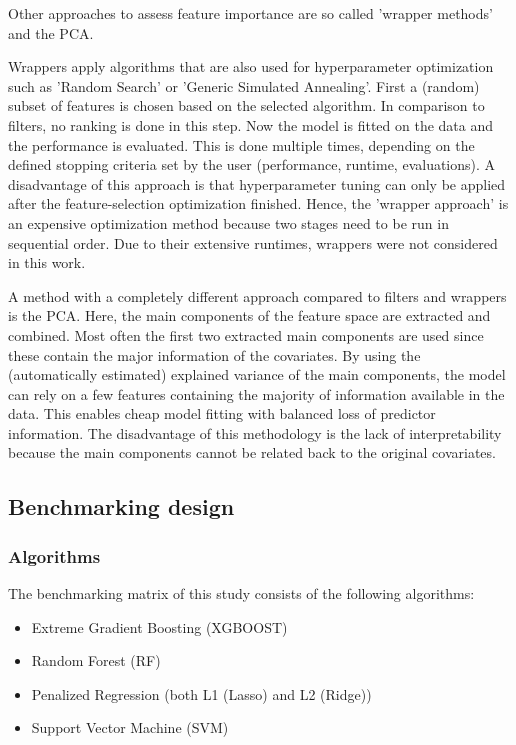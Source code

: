 \documentclass[letterpaper, peerreview]{IEEEtran}
\begin{document}
\noindent Other approaches to assess feature importance are so called 'wrapper methods' and the \ac{PCA}\cite{das2001, jolliffe2016}.

\noindent Wrappers \cite{chandrashekar2014, kohavi1997} apply algorithms that are also used for hyperparameter optimization such as 'Random Search' or 'Generic Simulated Annealing'.
First a (random) subset of features is chosen based on the selected algorithm.
In comparison to filters, no ranking is done in this step.
Now the model is fitted on the data and the performance is evaluated.
This is done multiple times, depending on the defined stopping criteria set by the user (performance, runtime, evaluations).
A disadvantage of this approach is that hyperparameter tuning can only be applied after the feature-selection optimization finished.
Hence, the 'wrapper approach' is an expensive optimization method because two stages need to be run in sequential order.
Due to their extensive runtimes, wrappers were not considered in this work.

A method with a completely different approach compared to filters and wrappers is the \ac{PCA}\cite{pearson1901, jolliffe2016}.
Here, the main components of the feature space are extracted and combined.
Most often the first two extracted main components are used since these contain the major information of the covariates.
By using the (automatically estimated) explained variance of the main components, the model can rely on a few features containing the majority of information available in the data.
This enables cheap model fitting with balanced loss of predictor information.
The disadvantage of this methodology is the lack of interpretability because the main components cannot be related back to the original covariates.

\subsection{Benchmarking design}

\subsubsection{Algorithms}

\noindent The benchmarking matrix of this study consists of the following algorithms:

\begin{itemize}
	\item  Extreme Gradient Boosting (XGBOOST)
	\item  Random Forest (RF)
	\item  Penalized Regression (both L1 (Lasso) and L2 (Ridge))
	\item  Support Vector Machine (SVM)
\end{itemize}
\end{document}
